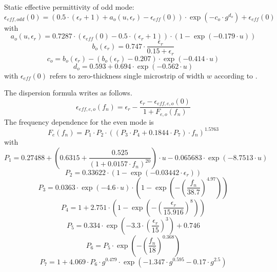 \documentclass[10pt]{report}
\begin{document}
Static effective permittivity of odd mode:
\begin{equation}
\epsilon_{eff,odd}(0) = (0.5\cdot (\epsilon_r+1) + a_o(u,\epsilon_r) - \epsilon_{eff}(0) ) \cdot
      \exp(-c_o\cdot g^{d_o}) + \epsilon_{eff}(0)
\end{equation}
with
\begin{equation}
a_o(u,\epsilon_r) = 0.7287\cdot( \epsilon_{eff}(0) - 0.5\cdot ( \epsilon_r + 1) ) \cdot
      (1-\exp(-0.179\cdot u))
\end{equation}
\begin{equation}
b_o(\epsilon_r) = 0.747\cdot\frac{\epsilon_r}{0.15+\epsilon_r}
\end{equation}
\begin{equation}
c_o = b_o(\epsilon_r) - (b_o(\epsilon_r)-0.207)\cdot\exp(-0.414\cdot u)
\end{equation}
\begin{equation}
d_o = 0.593+0.694\cdot\exp(-0.562\cdot u)
\end{equation}
with $\epsilon_{eff}(0)$ refers to zero-thickness single microstrip of width
$w$ according to \cite{Hammerstad}.

\addvspace{12pt}

The dispersion formula writes as follows.
\begin{equation}
\epsilon_{eff,e,o}(f_n) = \epsilon_r - \frac{\epsilon_r - \epsilon_{eff,e,o}(0)}{1+F_{e,o}(f_n)}
\end{equation}
The frequency dependence for the even mode is
\begin{equation}
F_e(f_n) = P_1\cdot P_2\cdot ((P_3\cdot P_4 + 0.1844\cdot P_7)\cdot f_n)^{1.5763}
\end{equation}
with
\begin{equation}
P_1 = 0.27488 + \left( 0.6315 + \frac{0.525}{(1+0.0157\cdot f_n)^{20}} \right) \cdot u
     -0.065683\cdot\exp(-8.7513\cdot u)
\end{equation}
\begin{equation}
P_2 = 0.33622\cdot (1-\exp(-0.03442\cdot\epsilon_r))
\end{equation}
\begin{equation}
P_3 = 0.0363\cdot\exp(-4.6\cdot u)\cdot\left( 1-\exp\left(
    -\left( \frac{f_n}{38.7}\right) ^{4.97} \right) \right)
\end{equation}
\begin{equation}
P_4 = 1 + 2.751\cdot\left( 1-\exp\left( -\left( \frac{\epsilon_r}{15.916}\right) ^8 \right) \right)
\end{equation}
\begin{equation}
P_5 = 0.334\cdot\exp\left( -3.3\cdot\left( \frac{\epsilon_r}{15}\right) ^3 \right) + 0.746
\end{equation}
\begin{equation}
P_6 = P_5\cdot\exp\left( -\left( \frac{f_n}{18}\right) ^{0.368} \right)
\end{equation}
\begin{equation}
P_7 = 1 + 4.069\cdot P_6 \cdot g^{0.479}\cdot\exp(-1.347\cdot g^{0.595} - 0.17\cdot g^{2.5} )
\end{equation}
\end{document}
